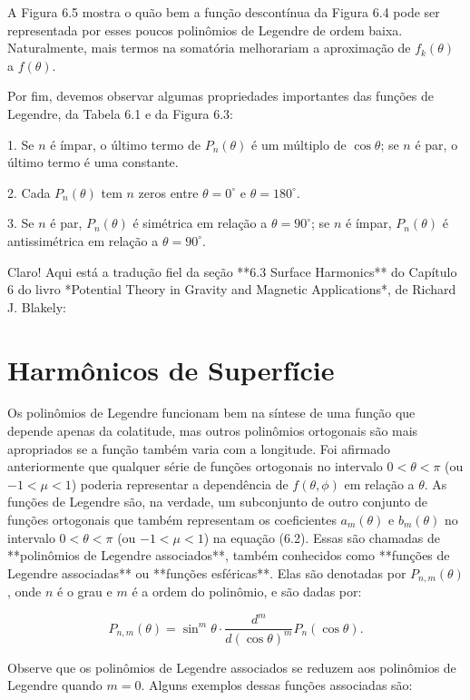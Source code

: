 A Figura 6.5 mostra o quão bem a função descontínua da Figura 6.4 pode ser representada por esses poucos polinômios de Legendre de ordem baixa. Naturalmente, mais termos na somatória melhorariam a aproximação de $f_k(\theta)$ a $f(\theta)$.

Por fim, devemos observar algumas propriedades importantes das funções de Legendre, da Tabela 6.1 e da Figura 6.3:

1. Se $n$ é ímpar, o último termo de $P_n(\theta)$ é um múltiplo de $\cos\theta$; se $n$ é par, o último termo é uma constante.

2. Cada $P_n(\theta)$ tem $n$ zeros entre $\theta = 0^\circ$ e $\theta = 180^\circ$.

3. Se $n$ é par, $P_n(\theta)$ é simétrica em relação a $\theta = 90^\circ$; se $n$ é ímpar, $P_n(\theta)$ é antissimétrica em relação a $\theta = 90^\circ$.


Claro! Aqui está a tradução fiel da seção **6.3 Surface Harmonics** do Capítulo 6 do livro *Potential Theory in Gravity and Magnetic Applications*, de Richard J. Blakely:

\section{Harmônicos de Superfície}



Os polinômios de Legendre funcionam bem na síntese de uma função que depende apenas da colatitude, mas outros polinômios ortogonais são mais apropriados se a função também varia com a longitude. Foi afirmado anteriormente que qualquer série de funções ortogonais no intervalo $0 < \theta < \pi$ (ou $-1 < \mu < 1$) poderia representar a dependência de $f(\theta, \phi)$ em relação a $\theta$. As funções de Legendre são, na verdade, um subconjunto de outro conjunto de funções ortogonais que também representam os coeficientes $a_m(\theta)$ e $b_m(\theta)$ no intervalo $0 < \theta < \pi$ (ou $-1 < \mu < 1$) na equação (6.2). Essas são chamadas de **polinômios de Legendre associados**, também conhecidos como **funções de Legendre associadas** ou **funções esféricas**. Elas são denotadas por $P_{n,m}(\theta)$, onde $n$ é o grau e $m$ é a ordem do polinômio, e são dadas por:

$$
P_{n,m}(\theta) = \sin^m \theta \cdot \frac{d^m}{d(\cos\theta)^m} P_n(\cos\theta). \tag{6.10}
$$

Observe que os polinômios de Legendre associados se reduzem aos polinômios de Legendre quando $m = 0$. Alguns exemplos dessas funções associadas são:

